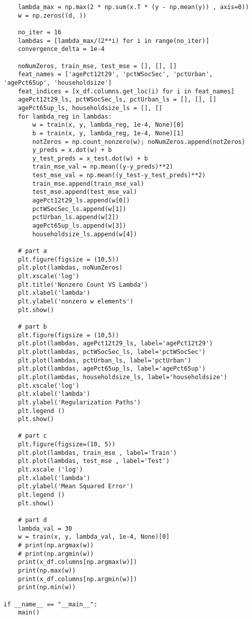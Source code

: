 \documentclass{article}
\begin{document}
\begin{aprob}
\begin{lstlisting}
    lambda_max = np.max(2 * np.sum(x.T * (y - np.mean(y)) , axis=0))
    w = np.zeros((d, )) 

    no_iter = 16
    lambdas = [lambda_max/(2**i) for i in range(no_iter)]
    convergence_delta = 1e-4

    noNumZeros, train_mse, test_mse = [], [], []
    feat_names = ['agePct12t29', 'pctWSocSec', 'pctUrban', 'agePct65up', 'householdsize']
    feat_indices = [x_df.columns.get_loc(i) for i in feat_names]
    agePct12t29_ls, pctWSocSec_ls, pctUrban_ls = [], [], [] 
    agePct65up_ls, householdsize_ls = [], []
    for lambda_reg in lambdas:
        w = train(x, y, lambda_reg, 1e-4, None)[0]
        b = train(x, y, lambda_reg, 1e-4, None)[1]
        notZeros = np.count_nonzero(w); noNumZeros.append(notZeros)
        y_preds = x.dot(w) + b
        y_test_preds = x_test.dot(w) + b
        train_mse_val = np.mean((y-y_preds)**2)
        test_mse_val = np.mean((y_test-y_test_preds)**2)
        train_mse.append(train_mse_val)
        test_mse.append(test_mse_val)
        agePct12t29_ls.append(w[0])
        pctWSocSec_ls.append(w[1])
        pctUrban_ls.append(w[2])
        agePct65up_ls.append(w[3])
        householdsize_ls.append(w[4])

    # part a
    plt.figure(figsize = (10,5))
    plt.plot(lambdas, noNumZeros)
    plt.xscale('log')
    plt.title('Nonzero Count VS Lambda')
    plt.xlabel('lambda')
    plt.ylabel('nonzero w elements')
    plt.show()

    # part b
    plt.figure(figsize = (10,5))
    plt.plot(lambdas, agePct12t29_ls, label='agePct12t29')
    plt.plot(lambdas, pctWSocSec_ls, label='pctWSocSec')
    plt.plot(lambdas, pctUrban_ls, label='pctUrban')
    plt.plot(lambdas, agePct65up_ls, label='agePct65up')
    plt.plot(lambdas, householdsize_ls, label='householdsize')
    plt.xscale('log')
    plt.xlabel('lambda')
    plt.ylabel('Regularization Paths')
    plt.legend ()
    plt.show()

    # part c
    plt.figure(figsize=(10, 5))
    plt.plot(lambdas, train_mse , label='Train') 
    plt.plot(lambdas, test_mse , label='Test') 
    plt.xscale ('log')
    plt.xlabel('lambda')
    plt.ylabel('Mean Squared Error')
    plt.legend ()
    plt.show()

    # part d
    lambda_val = 30
    w = train(x, y, lambda_val, 1e-4, None)[0]
    # print(np.argmax(w))
    # print(np.argmin(w))
    print(x_df.columns[np.argmax(w)])
    print(np.max(w))
    print(x_df.columns[np.argmin(w)])
    print(np.min(w))

if __name__ == "__main__":
    main()
    \end{lstlisting}
\end{aprob}
\newpage 
\end{document}
